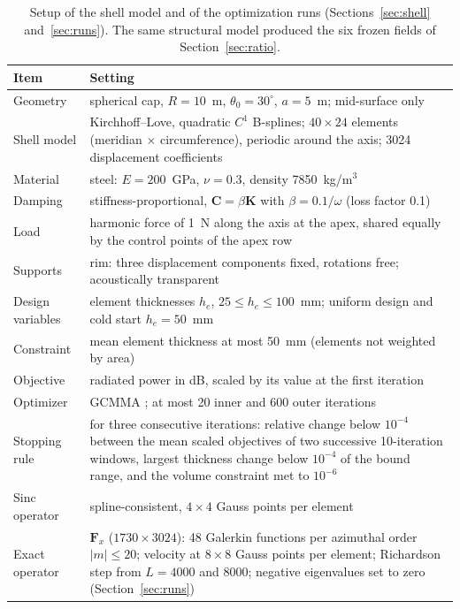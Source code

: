 \documentclass[preprint,12pt]{elsarticle}
\begin{document}
\begin{table}[t]
\centering
\caption{Setup of the shell model and of the optimization runs (Sections~\ref{sec:shell} and~\ref{sec:runs}). The same structural model produced the six frozen fields of Section~\ref{sec:ratio}.}
\label{tab:setup}
\small
\begin{tabular}{>{\raggedright\arraybackslash}p{27mm}>{\raggedright\arraybackslash}p{101mm}}
\toprule
Item & Setting \\
\midrule
Geometry & spherical cap, $R=10$~m, $\theta_0=30^\circ$, $a=5$~m; mid-surface only \\
Shell model & Kirchhoff--Love, quadratic $C^1$ B-splines; $40\times24$ elements (meridian $\times$ circumference), periodic around the axis; 3024 displacement coefficients \\
Material & steel: $E=200$~GPa, $\nu=0.3$, density 7850~kg/m$^3$ \\
Damping & stiffness-proportional, $\mathbf C=\beta\mathbf K$ with $\beta=0.1/\omega$ (loss factor 0.1) \\
Load & harmonic force of 1~N along the axis at the apex, shared equally by the control points of the apex row \\
Supports & rim: three displacement components fixed, rotations free; acoustically transparent \\
Design variables & 960 element thicknesses $h_e$, $25\le h_e\le100$~mm; uniform design and cold start $h_e=50$~mm \\
Constraint & mean element thickness at most 50~mm (elements not weighted by area) \\
Objective & radiated power in dB, scaled by its value at the first iteration \\
Optimizer & GCMMA \cite{Svanberg2002}; at most 20 inner and 600 outer iterations \\
Stopping rule & for three consecutive iterations: relative change below $10^{-4}$ between the mean scaled objectives of two successive 10-iteration windows, largest thickness change below $10^{-4}$ of the bound range, and the volume constraint met to $10^{-6}$ \\
Sinc operator & spline-consistent, $4\times4$ Gauss points per element \\
Exact operator & $\mathbf F_x$ ($1730\times3024$): 48 Galerkin functions per azimuthal order $|m|\le20$; velocity at $8\times8$ Gauss points per element; Richardson step from $L=4000$ and 8000; negative eigenvalues set to zero (Section~\ref{sec:runs}) \\
\bottomrule
\end{tabular}
\end{table}
\end{document}
